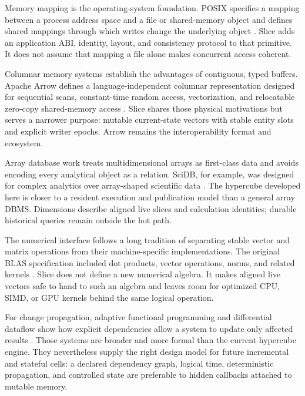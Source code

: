 \documentclass{strategynet-journal}
\newcommand{\SLICE}{\textsf{Slice}}
\begin{document}
\begin{SNcolumns}

Memory mapping is the operating-system foundation.  POSIX specifies a mapping
between a process address space and a file or shared-memory object and defines
shared mappings through which writes change the underlying object
\cite{posixmmap}.  \SLICE{} adds an application ABI, identity, layout, and
consistency protocol to that primitive.  It does not assume that mapping a
file alone makes concurrent access coherent.

Columnar memory systems establish the advantages of contiguous, typed buffers.
Apache Arrow defines a language-independent columnar representation designed
for sequential scans, constant-time random access, vectorization, and
relocatable zero-copy shared-memory access \cite{arrow}.  \SLICE{} shares
those physical motivations but serves a narrower purpose: mutable current-state
vectors with stable entity slots and explicit writer epochs.  Arrow remains the
interoperability format and ecosystem.

Array database work treats multidimensional arrays as first-class data and
avoids encoding every analytical object as a relation.  SciDB, for example, was
designed for complex analytics over array-shaped scientific data
\cite{scidb}.  The hypercube developed here is closer to a resident execution
and publication model than a general array DBMS.  Dimensions describe aligned
live slices and calculation identities; durable historical queries remain
outside the hot path.

The numerical interface follows a long tradition of separating stable vector
and matrix operations from their machine-specific implementations.  The
original BLAS specification included dot products, vector operations, norms,
and related kernels \cite{blas}.  \SLICE{} does not define a new numerical
algebra.  It makes aligned live vectors safe to hand to such an algebra and
leaves room for optimized CPU, SIMD, or GPU kernels behind the same logical
operation.

For change propagation, adaptive functional programming and differential
dataflow show how explicit dependencies allow a system to update only affected
results \cite{adaptive,differential}.
Those systems are broader and more formal than the current hypercube engine.
They nevertheless supply the right design model for future incremental and
stateful cells: a declared dependency graph, logical time, deterministic propagation,
and controlled state are preferable to hidden callbacks attached to mutable
memory.

\end{SNcolumns}
\end{document}
